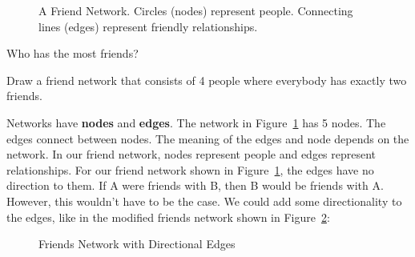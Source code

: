 \begin{figure}[H]
\begin{center}
\caption{A Friend Network. Circles (nodes) represent people. Connecting lines (edges) represent friendly relationships.}
\label{F:1FN}
\end{center}
\end{figure}

\par
\begin{alevel}
Who has the most friends?
\end{alevel}
\begin{alevel}
Draw a friend network that consists of 4 people where everybody has exactly two friends.
\end{alevel}
\par

\noindent
Networks have \textbf{nodes} and \textbf{edges}. The network in Figure~\ref{F:1FN} has 5 nodes. The edges connect between nodes.  The meaning of the edges and node depends on the network. In our friend network, nodes represent people and edges represent relationships. For our friend network shown in Figure~\ref{F:1FN}, the edges have no direction to them. If A were friends with B, then B would be friends with A. However, this wouldn't have to be the case. We could add some directionality to the edges, like in the modified friends network shown in Figure~\ref{F:1FNb}:\\

\begin{figure}[H]
\begin{center}
\caption{Friends Network with Directional Edges}
\label{F:1FNb}
\end{center}
\end{figure}
\par

